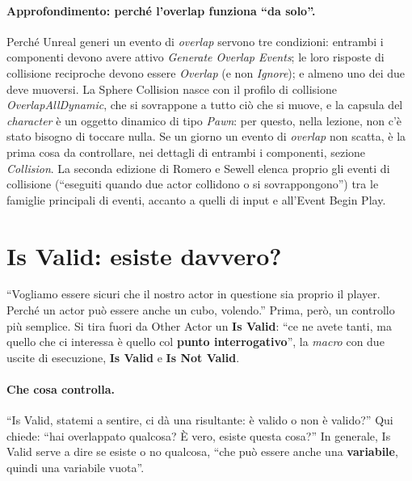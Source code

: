 \paragraph{Approfondimento: perché l'overlap funziona ``da solo''.} Perché Unreal generi
un evento di \emph{overlap} servono tre condizioni: entrambi i componenti devono avere
attivo \emph{Generate Overlap Events}; le loro risposte di collisione reciproche devono
essere \emph{Overlap} (e non \emph{Ignore}); e almeno uno dei due deve muoversi. La
Sphere Collision nasce con il profilo di collisione \emph{OverlapAllDynamic}, che si
sovrappone a tutto ciò che si muove, e la capsula del \emph{character} è un oggetto
dinamico di tipo \emph{Pawn}: per questo, nella lezione, non c'è stato bisogno di
toccare nulla. Se un giorno un evento di \emph{overlap} non scatta, è la prima cosa da
controllare, nei dettagli di entrambi i componenti, sezione \emph{Collision}. La seconda
edizione di Romero e Sewell elenca proprio gli eventi di collisione (``eseguiti quando
due actor collidono o si sovrappongono'') tra le famiglie principali di eventi, accanto
a quelli di input e all'Event Begin Play.

\section{Is Valid: esiste davvero?}
\label{ue4:sec:isvalid}

``Vogliamo essere sicuri che il nostro actor in questione sia proprio il player. Perché
un actor può essere anche un cubo, volendo.'' Prima, però, un controllo più semplice. Si
tira fuori da Other Actor un \textbf{Is Valid}: ``ce ne avete tanti, ma quello che ci
interessa è quello col \textbf{punto interrogativo}'', la \emph{macro} con due uscite di
esecuzione, \textbf{Is Valid} e \textbf{Is Not Valid}.

\paragraph{Che cosa controlla.} ``Is Valid, statemi a sentire, ci dà una risultante: è
valido o non è valido?'' Qui chiede: ``hai overlappato qualcosa? È vero, esiste questa
cosa?'' In generale, Is Valid serve a dire se esiste o no qualcosa, ``che può essere
anche una \textbf{variabile}, quindi una variabile vuota''.

